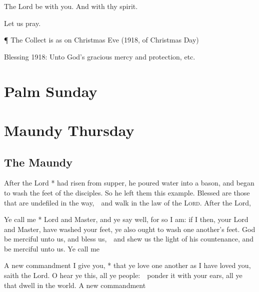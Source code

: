 \V The Lord be with you. \R And with thy spirit.

\centerline{Let us pray.}

¶ The {Collect} is as on Christmas Eve
(1918, of Christmas Day)

Blessing
1918: Unto God's gracious mercy and protection, etc.


\fleuron


\section{Palm Sunday}
\section{Maundy Thursday}

\subsection{The Maundy}
\ant After the Lord * had risen from supper, he poured water into a bason, and began to wash the feet of the disciples. So he left them this example.  Blessed are those that are undefiled in the way,\ \star\ and walk in the law of the {\scshape Lord}.  After the Lord, \etc

\ant Ye call me * Lord and Master, and ye say well, for so I am: if I then, your Lord and Master, have washed your feet, ye also ought to wash one another’s feet.  God be merciful unto us, and bless us,\ \star\ and shew us the light of his countenance, and be merciful unto us.  Ye call me \etc

\ant A new commandment I give you, * that ye love one another as I have loved you, saith the Lord.  O hear ye this, all ye people:\ \star\ ponder it with your ears, all ye that dwell in the world.  A new commandment \etc

